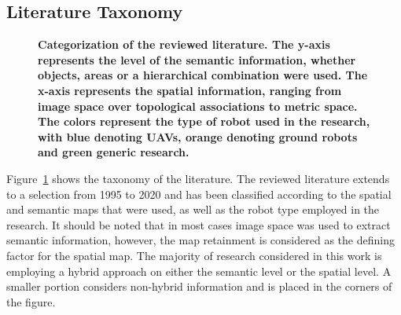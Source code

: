 \documentclass[twocolumn,letterpaper]{IEEEAerospaceCLS}  %
\begin{document}
\subsection{Literature Taxonomy} \label{ssec:ResLit}
\begin{figure}
    \centering
    \caption{\bf{
        Categorization of the reviewed literature. The y-axis represents the level of the semantic information, whether objects, areas or a hierarchical combination were used. The x-axis represents the spatial information, ranging from image space over topological associations to metric space. The colors represent the type of robot used in the research, with blue denoting UAVs, orange denoting ground robots and green generic research.
    }}
    \label{fig:LitRes}
\end{figure}
Figure~\ref{fig:LitRes} shows the taxonomy of the literature. The reviewed literature extends to a selection from 1995 to 2020 and has been classified according to the spatial and semantic maps that were used, as well as the robot type employed in the research. It should be noted that in most cases image space was used to extract semantic information, however, the map retainment is considered as the defining factor for the spatial map. The majority  of research considered in this work is employing a hybrid approach on either the semantic level or the spatial level. A smaller portion considers non-hybrid information and is placed in the corners of the figure.  
\end{document}
